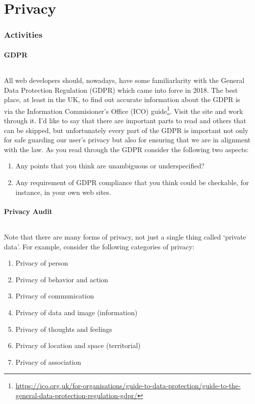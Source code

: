 \documentclass[10pt, a4paper, twosize]{article}
\begin{document}
\clearpage
\part{Privacy}
\section*{Activities}
\subsection*{GDPR}
\paragraph{} All web developers should, nowadays, have some familiarlarity with the General Data Protection Regulation (GDPR) which came into force in 2018. The best place, at least in the UK, to find out accurate information about the GDPR is via the Information Commisioner's Office (ICO) guide\footnote{\url{https://ico.org.uk/for-organisations/guide-to-data-protection/guide-to-the-general-data-protection-regulation-gdpr/}}. Visit the site and work through it. I'd like to say that there are important parts to read and others that can be skipped, but unfortunately every part of the GDPR is important not only for safe guarding our user's privacy but also for ensuring that we are in alignment with the law. As you read through the GDPR consider the following two aspects:

\begin{enumerate}
\item Any points that you think are unambiguous or underspecified?
\item Any requirement of GDPR compliance that you think could be checkable, for instance, in your own web sites.
\end{enumerate}

\subsection*{Privacy Audit}
\paragraph{} Note that there are many forms of privacy, not just a single thing called `private data'. For example, consider the following categories of privacy:

\begin{enumerate}
\item Privacy of person
\item Privacy of behavior and action
\item Privacy of communication
\item Privacy of data and image (information)
\item Privacy of thoughts and feelings
\item Privacy of location and space (territorial)
\item Privacy of association
\end{enumerate}
\end{document}
